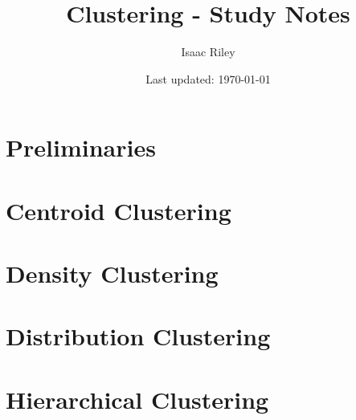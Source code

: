 \documentclass[a4paper]{article}
\title{Clustering - Study Notes}
\author{Isaac Riley}
\date{Last updated: \today}
\begin{document}
\maketitle
\tableofcontents
\newpage

% 

\setcounter{section}{-1}
\section{Preliminaries}


\section{Centroid Clustering}



% 
% 
% 

\newpage
\section{Density Clustering}

% 
% 
% 

\newpage
\section{Distribution Clustering}

% 
% 
% 

\newpage
\section{Hierarchical Clustering}
\end{document}
